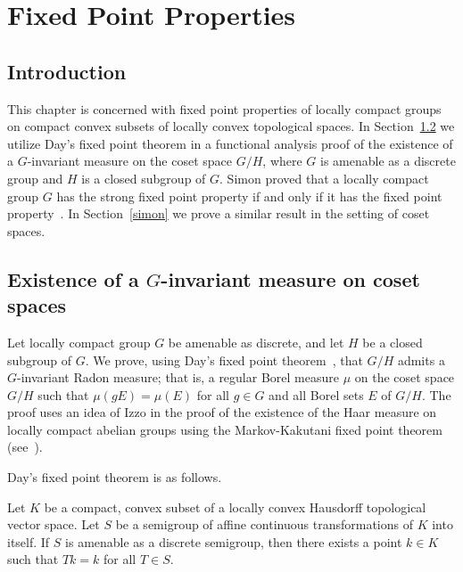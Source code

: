 \chapter{Fixed Point Properties}

\section{Introduction}

This chapter is concerned with fixed point properties of locally compact groups
on compact convex subsets of locally convex topological spaces.
In Section~\ref{haar} we utilize Day's fixed point theorem in a functional
analysis proof of the existence
of a $G$-invariant measure on the coset space $G/H$, where $G$ is amenable as
a discrete group and $H$ is a closed subgroup of $G$.
Simon proved that a locally compact group $G$ has the strong fixed point
property if and only if it has the fixed point property~\cite{simon}.
In Section~\ref{simon} we prove a similar result in the setting of coset spaces.

\section{Existence of a $G$-invariant measure on coset spaces}\label{haar}

Let locally compact group $G$ be amenable as discrete, and let $H$ be a closed subgroup of $G$.
We prove, using Day's fixed point theorem~\cite{day:fpt},
that $G/H$ admits a $G$-invariant Radon measure; 
that is, a regular Borel measure $\mu$ on the coset space $G/H$ such that $\mu(gE) = 
\mu(E)$ for all $g \in G$ and all Borel sets $E$ of $G/H$.  The proof uses an idea
of Izzo in the proof of the existence of the Haar measure on locally compact
abelian groups using the Markov-Kakutani fixed point theorem (see~\cite{izzo:haar}).

Day's fixed point theorem is as follows.
\begin{theorem}[Day]
Let $K$ be a compact, convex subset of a locally convex Hausdorff 
topological vector space.  Let $S$ be a semigroup of affine continuous 
transformations of $K$ into itself.  If $S$ is amenable as a discrete 
semigroup, then there exists a point $k \in K$ such that $Tk=k$ for all $T 
\in S$.
\end{theorem}

